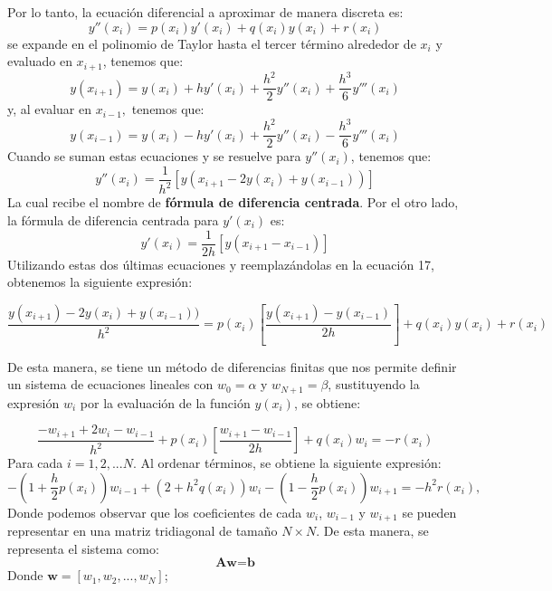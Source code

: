 \documentclass[12pt,twoside]{extarticle}
\begin{document}
 Por lo tanto, la ecuación diferencial a aproximar de manera discreta es:
 \begin{equation}
     y''(x_i) = p(x_i)y'(x_i) + q(x_i)y(x_i)+r(x_i)
 \end{equation}
 se expande en el polinomio de Taylor hasta el tercer término alrededor de $x_i$ y evaluado en $x_{i+1}$, tenemos que:
 \begin{equation*}
     y(x_{i+1})= y(x_i) + hy'(x_i)+\frac{h^2}{2}y''(x_i)+\frac{h^3}{6}y'''(x_i) 
 \end{equation*}
 y, al evaluar en $x_{i-1},$ tenemos que:
  \begin{equation*}
     y(x_{i-1})= y(x_i) - hy'(x_i)+\frac{h^2}{2}y''(x_i)-\frac{h^3}{6}y'''(x_i) 
 \end{equation*}
Cuando se suman estas ecuaciones y se resuelve para $y''(x_i)$, tenemos que:
\begin{equation}
    y''(x_i)=\frac{1}{h^2}\left[y(x_{i+1}-2y(x_i)+y(x_{i-1}))\right]
\end{equation}
 La cual recibe el nombre de \textbf{fórmula de diferencia centrada}.
 Por el otro lado, la fórmula de diferencia centrada para $y'(x_i)$ es:
 \begin{equation}
     y'(x_i)=\frac{1}{2h}\left[y(x_{i+1}-x_{i-1})\right]
 \end{equation}
 Utilizando estas dos últimas ecuaciones y reemplazándolas en la ecuación 17, obtenemos la siguiente expresión:

\begin{equation}
    \frac{y(x_{i+1})-2y(x_i)+y(x_{i-1}))}{h^2}=p(x_i)\left[\frac{y(x_{i+1})-y(x_{i-1})}{2h}\right] + q(x_i)y(x_i)+r(x_i)
\end{equation}

De esta manera, se tiene un método de diferencias finitas que nos permite definir un sistema de ecuaciones lineales con $w_0=\alpha$ y $w_{N+1}=\beta$, sustituyendo la expresión $w_i$ por la evaluación de la función $y(x_i)$, se obtiene:

\begin{equation}
    \frac{-w_{i+1}+2w_i-w_{i-1}}{h^2}+p(x_i)\left[\frac{w_{i+1}-w_{i-1}}{2h}\right] + q(x_i)w_i=-r(x_i)
\end{equation}
Para cada $i=1,2,...N.$ Al ordenar términos, se obtiene la siguiente expresión:
\begin{equation*}
    -\left(1+\frac{h}{2}p(x_i)\right)w_{i-1}+(2+h^2q(x_i))w_i-\left(1-\frac{h}{2}p(x_i)\right)w_{i+1}=-h^2r(x_i),
\end{equation*}
Donde podemos observar que los coeficientes de cada $w_i$, $w_{i-1}$ y $w_{i+1}$ se pueden representar en una matriz tridiagonal de tamaño $N\times N$. De esta manera, se representa el sistema como:
\begin{equation}
    \textbf{Aw} = \textbf{b}
\end{equation}
Donde $\textbf{w}=\left[w_1,w_2,...,w_N\right]$;
\end{document}
